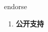 
\begin{frame}
{\huge endorse}
\begin{center}
\begin{enumerate}\Large
  \item \textbf{公开支持}
\end{enumerate}
\end{center}
\end{frame}
